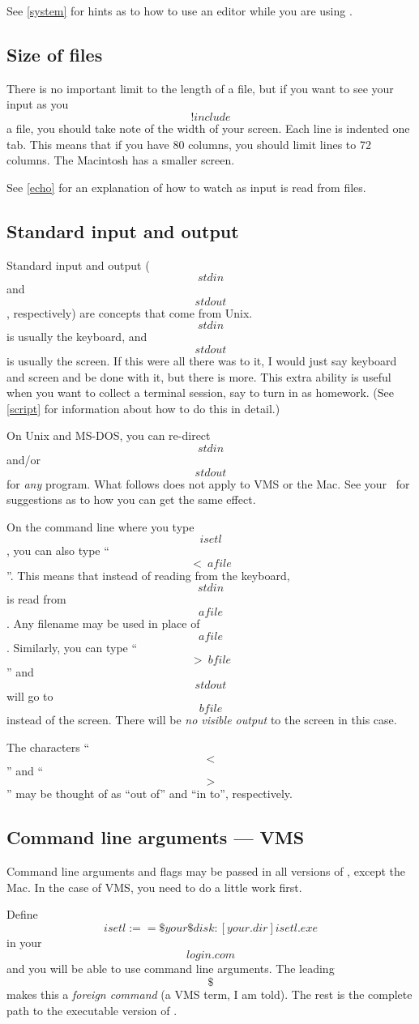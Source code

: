 See \ref{system} for hints as to how to use an editor while you are using
\ISETL.


\subsection{Size of files}
There is no important limit to the length of a file,
but if you want to see your input as you \[!include\] a file,
you should take note of the width of your screen.
Each line is indented one tab.  This means that if you have 80
columns, you should limit lines to 72 columns.
The Macintosh has a smaller screen.

See \ref{echo} for an explanation of how to watch as input is read
from files.


\subsection{Standard input and output}\label{redirection}
Standard input and output (\[stdin\] and \[stdout\], respectively)
are concepts that come from Unix.
\[stdin\] is usually the keyboard, and \[stdout\] is usually the screen.
If this were all there was to it, I would just say keyboard and screen and
be done with it, but there is more.
This extra ability is useful when you want to collect a terminal session,
say to turn in as homework.
(See \ref{script} for information about how to do this in detail.)

On Unix and MS-DOS, you can re-direct \[stdin\] and/or \[stdout\] for 
{\em any\/} program.  What follows does not apply to VMS or the Mac.
See your \GURU\ for
suggestions as to how you can get the same effect.

On the command line where you type \[isetl\], 
you can also type ``\[<~afile\]''.  This means that instead of
reading from the keyboard, \[stdin\] is read from \[afile\].
Any filename may be used in place of \[afile\].
Similarly, you can type ``\[>~bfile\]'' and \[stdout\] will go to
\[bfile\] instead of the screen.
There will be {\em no visible output\/} to the screen in this case.

The characters ``\[<\]'' and ``\[>\]'' may be thought of as ``out of'' and
``in to'', respectively.

\subsection{Command line arguments --- VMS}
Command line arguments and flags may be passed in all versions of \ISETL\@,
except the Mac.
In the case of VMS, you need to do a little work first.

Define \[isetl :== \$your\$disk:[your.dir]isetl.exe\] in your
\[login.com\] and you
will be able to use command line arguments.  The leading \[\$\] makes
this a {\em foreign command\/} (a VMS term, I am told).  The rest is the
complete path to the executable version of \ISETL\@.
